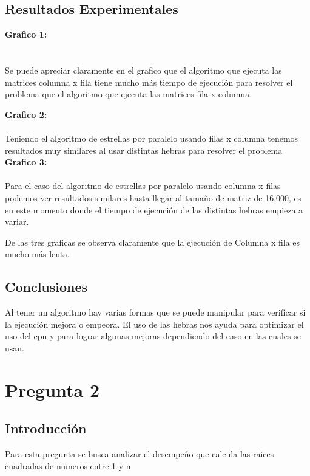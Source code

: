 \documentclass{report}
\begin{document}
\subsection{Resultados Experimentales}

\textbf{Grafico 1:}\\
\\
\\Se puede apreciar claramente en el grafico que el algoritmo que ejecuta las matrices columna x fila tiene mucho más tiempo de ejecución para resolver el problema que el algoritmo que ejecuta las matrices fila x columna.
\newpage

\textbf{Grafico 2:}\\
\\
Teniendo el algoritmo de estrellas por paralelo usando filas x columna tenemos resultados muy similares al usar distintas hebras para resolver el problema\\

\textbf{Grafico 3:}\\
\\Para el caso del algoritmo de estrellas por paralelo usando columna x filas podemos ver resultados similares hasta llegar al tamaño de matriz de 16.000, es en este momento donde el tiempo de ejecución de las distintas hebras empieza a variar.

De las tres graficas se observa claramente que la ejecución de Columna x fila es mucho m\'as lenta.

\subsection{Conclusiones}
Al tener un algoritmo hay varias formas que se puede manipular para verificar si la ejecuci\'on mejora o empeora.
El uso de las hebras nos ayuda para optimizar el uso del cpu y para lograr algunas mejoras dependiendo del caso en las cuales se usan.

%
\section{Pregunta 2}
\subsection{Introducci\'on}
Para esta pregunta se busca analizar el desempeño que calcula las raices cuadradas de numeros entre 1 y n 
\end{document}
